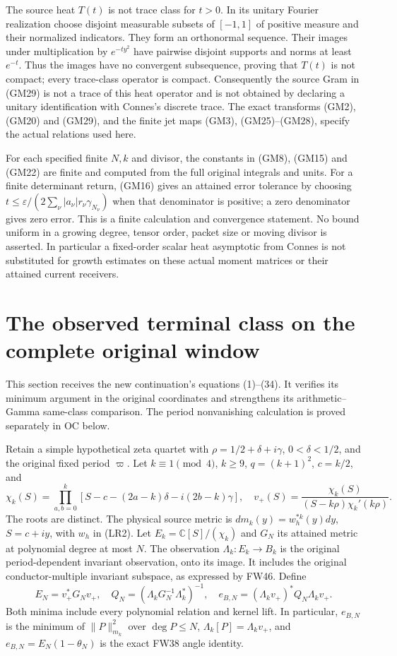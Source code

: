 \documentclass[11pt]{article}
\theoremstyle{remark}\newtheorem{remark}[theorem]{Remark}
\begin{document}
The source heat $T(t)$ is not trace class for $t>0$.  In its unitary
Fourier realization choose disjoint measurable subsets of $[-1,1]$
of positive measure and their normalized indicators.  They form an
orthonormal sequence.  Their images under multiplication by
$e^{-ty^2}$ have pairwise disjoint supports and norms at least
$e^{-t}$.  Thus the images have no convergent subsequence, proving
that $T(t)$ is not compact; every trace-class operator is compact.
Consequently the source Gram in (GM29) is not a trace of this heat
operator and is not obtained by declaring a unitary identification
with Connes's discrete trace.  The exact transforms (GM2), (GM20)
and (GM29), and the finite jet maps (GM3), (GM25)--(GM28), specify
the actual relations used here.

For each specified finite $N,k$ and divisor, the constants in
(GM8), (GM15) and (GM22) are finite and computed from the full
original integrals and units.  For a finite determinant return,
(GM16) gives an attained error tolerance by choosing
$t\leq\varepsilon/(2\sum_\nu|a_\nu|r_\nu\gamma_{N_\nu})$
when that denominator is positive; a zero denominator gives zero
error.  This is a finite calculation and convergence statement.
No bound uniform in a growing degree, tensor order, packet size or
moving divisor is asserted.  In particular a fixed-order scalar
heat asymptotic from Connes is not substituted for growth estimates
on these actual moment matrices or their attained current receivers.

\section{The observed terminal class on the complete original window}
This section receives the new continuation's equations (1)--(34).
It verifies its minimum argument in the original coordinates and
strengthens its arithmetic--Gamma same-class comparison. The period
nonvanishing calculation is proved separately in OC below.

Retain a simple hypothetical zeta quartet with
$\rho=1/2+\delta+i\gamma$, $0<\delta<1/2$, and the original fixed
period $\varpi$. Let $k\equiv1\pmod4$, $k\ge9$,
$q=(k+1)^2$, $c=k/2$, and
\[
 \chi_k(S)=\prod_{a,b=0}^k[S-c-(2a-k)\delta-i(2b-k)\gamma],\quad
 v_+(S)=\frac{\chi_k(S)}{(S-k\rho)\chi_k'(k\rho)}.\tag{OB1}
\]
The roots are distinct. The physical source metric is
$dm_k(y)=w_h^{*k}(y)dy$, $S=c+iy$, with $w_h$ in (LR2).
Let $E_k=\mathbb C[S]/(\chi_k)$ and $G_N$ its attained metric at
polynomial degree at most $N$. The observation $\Lambda_k:E_k\to B_k$
is the original period-dependent invariant observation, onto its image.
It includes the original conductor-multiple invariant subspace, as
expressed by FW46. Define
\[
 E_N=v_+^*G_Nv_+,\quad Q_N=(\Lambda_kG_N^{-1}\Lambda_k^*)^{-1},
 \quad e_{B,N}=(\Lambda_kv_+)^*Q_N\Lambda_kv_+ .\tag{OB2}
\]
Both minima include every polynomial relation and kernel lift. In
particular, $e_{B,N}$ is the minimum of $\|P\|_{m_k}^2$ over
$\deg P\le N$, $\Lambda_k[P]=\Lambda_kv_+$, and
$e_{B,N}=E_N(1-\theta_N)$ is the exact FW38 angle identity.
\end{document}
